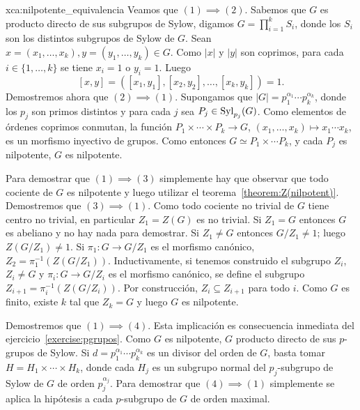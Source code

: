 \begin{sol}{xca:nilpotente_equivalencia}
	Veamos que $(1)\implies(2)$. Sabemos que $G$ es producto directo de sus
	subgrupos de Sylow, digamos $G=\prod_{i=1}^k S_i$, donde los $S_i$ son los
	distintos subgrupos de Sylow de $G$.  Sean
	$x=(x_1,\dots,x_k),y=(y_1,\dots,y_k)\in G$. Como $|x|$ y $|y|$ son
	coprimos, para cada $i\in\{1,\dots,k\}$ se tiene $x_i=1$ o $y_i=1$. Luego
	\[
		[x,y]=([x_1,y_1],[x_2,y_2],\dots,[x_k,y_k])=1. 
	\]
	Demostremos ahora que $(2)\implies(1)$. Supongamos que
	$|G|=p_1^{\alpha_1}\cdots p_k^{\alpha_k}$, donde los $p_j$ son primos
	distintos y para cada $j$ sea $P_j\in\mathrm{Syl}_{p_j}(G)$. Como elementos de
	órdenes coprimos conmutan, la función $P_1\times\cdots\times P_k\to G$,
	$(x_1,\dots,x_k)\mapsto x_1\cdots x_k$, es un morfismo inyectivo de grupos.
	Como entonces $G\simeq P_1\times\cdots P_k$, y cada $P_j$ es nilpotente,
	$G$ es nilpotente. 

	Para demostrar que $(1)\implies(3)$ simplemente hay que observar que todo
	cociente de $G$ es nilpotente y luego utilizar el
	teorema~\ref{theorem:Z(nilpotent)}. Demostremos que $(3)\implies(1)$. Como
	todo cociente no trivial de $G$ tiene centro no trivial, en particular
	$Z_1=Z(G)$ es no trivial. Si $Z_1=G$ entonces $G$ es abeliano y no hay nada
	para demostrar. Si $Z_1\ne G$ entonces $G/Z_1\ne 1$; luego $Z(G/Z_1)\ne 1$.
	Si $\pi_1\colon G\to G/Z_1$ es el morfismo canónico,
	$Z_2=\pi_1^{-1}(Z(G/Z_1))$. Inductivamente, si tenemos construido el
	subgrupo $Z_i$, $Z_i\ne G$ y  $\pi_i\colon G\to G/Z_{i}$ es el morfismo
	canónico, se define el subgrupo $Z_{i+1}=\pi_i^{-1}(Z(G/Z_i))$. Por
	construcción, $Z_i\subseteq Z_{i+1}$ para todo $i$. Como $G$ es finito,
	existe $k$ tal que $Z_k=G$ y luego $G$ es nilpotente.

	Demostremos que $(1)\implies(4)$. Esta implicación es consecuencia
	inmediata del ejercicio~\ref{exercise:pgrupos}. 
	Como $G$ es nilpotente, $G$ producto
	directo de sus $p$-grupos de Sylow. Si $d=p_1^{\alpha_1}\cdots
	p_k^{\alpha_k}$ es un divisor del orden de $G$, basta tomar
	$H=H_1\times\cdots\times H_k$, 
	donde cada $H_j$ es un subgrupo normal del $p_j$-subgrupo de Sylow de $G$
	de orden $p_j^{\alpha_j}$. Para demostrar que $(4)\implies(1)$ simplemente
	se aplica la hipótesis a cada $p$-subgrupo de $G$ de orden maximal.
\end{sol}

